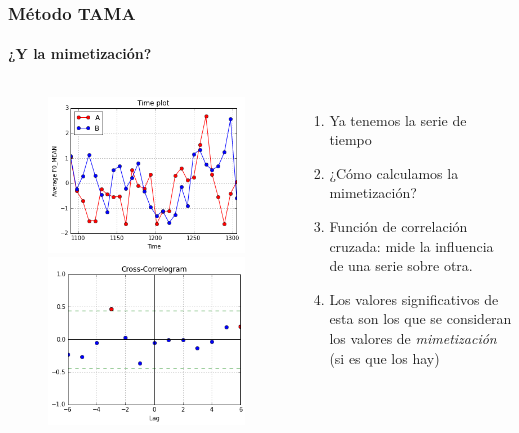 \begin{frame}
  \frametitle{Método TAMA}
  \framesubtitle{¿Y la mimetización?}
  \begin{columns}

  \begin{figure}[t]
    \includegraphics[scale=0.33]{images/time_plot.png}

    \includegraphics[scale=0.33]{images/cross_correlogram.png}
  \end{figure}

  \begin{enumerate}
    \item Ya tenemos la serie de tiempo
    \item ¿Cómo calculamos la mimetización?
    \item Función de correlación cruzada: mide la influencia de una serie sobre otra.
    \item Los valores significativos de esta son los que se consideran los valores de \emph{mimetización} (si es que los hay)
  \end{enumerate}

  \end{columns}
\end{frame}


